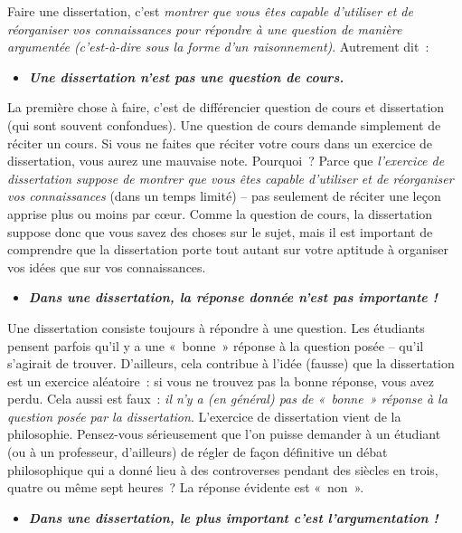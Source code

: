 \documentclass[
  letterpaper,
  DIV=11,
  numbers=noendperiod]{scrartcl}
\providecommand{\tightlist}{%
  \setlength{\itemsep}{0pt}\setlength{\parskip}{0pt}}\usepackage{longtable,booktabs,array}
\begin{document}
Faire une dissertation, c'est \emph{montrer que vous êtes capable
d'utiliser et de réorganiser vos connaissances pour répondre à une
question de manière argumentée (c'est-à-dire sous la forme d'un
raisonnement)}. Autrement dit~:

\begin{itemize}
\tightlist
\item
  \textbf{\emph{Une dissertation n'est pas une question de cours.}}
\end{itemize}

La première chose à faire, c'est de différencier question de cours et
dissertation (qui sont souvent confondues). Une question de cours
demande simplement de réciter un cours. Si vous ne faites que réciter
votre cours dans un exercice de dissertation, vous aurez une mauvaise
note. Pourquoi~? Parce que \emph{l'exercice de dissertation suppose de
montrer que vous êtes capable d'utiliser et de réorganiser vos
connaissances} (dans un temps limité) -- pas seulement de réciter une
leçon apprise plus ou moins par cœur. Comme la question de cours, la
dissertation suppose donc que vous savez des choses sur le sujet, mais
il est important de comprendre que la dissertation porte tout autant sur
votre aptitude à organiser vos idées que sur vos connaissances.

\begin{itemize}
\tightlist
\item
  \textbf{\emph{Dans une dissertation, la réponse donnée n'est pas
  importante !}}
\end{itemize}

Une dissertation consiste toujours à répondre à une question. Les
étudiants pensent parfois qu'il y a une «~bonne~» réponse à la question
posée -- qu'il s'agirait de trouver. D'ailleurs, cela contribue à l'idée
(fausse) que la dissertation est un exercice aléatoire~: si vous ne
trouvez pas la bonne réponse, vous avez perdu. Cela aussi est faux~:
\emph{il n'y a (en général) pas de «~bonne~» réponse à la question posée
par la dissertation}. L'exercice de dissertation vient de la
philosophie. Pensez-vous sérieusement que l'on puisse demander à un
étudiant (ou à un professeur, d'ailleurs) de régler de façon définitive
un débat philosophique qui a donné lieu à des controverses pendant des
siècles en trois, quatre ou même sept heures~? La réponse évidente est
«~non~».

\begin{itemize}
\tightlist
\item
  \textbf{\emph{Dans une dissertation, le plus important c'est
  l'argumentation !}}
\end{itemize}
\end{document}
